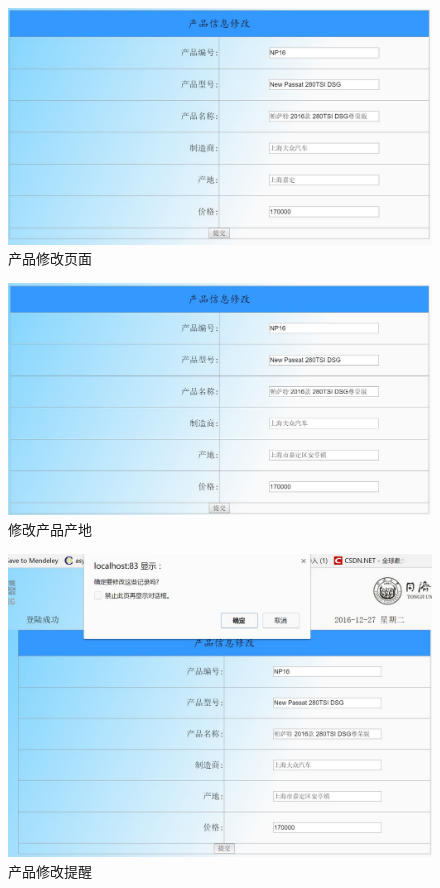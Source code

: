 \begin{figure}[H]
\centering
\includegraphics[width=0.8\linewidth]{figure/prd_mofify_index}
\caption{产品修改页面}
\label{fig:prd_mofify_index}
\end{figure}

\begin{figure}[H]
\centering
\includegraphics[width=0.8\linewidth]{figure/prd_mofify_area}
\caption{修改产品产地}
\label{fig:prd_mofify_area}
\end{figure}

\begin{figure}[H]
\centering
\includegraphics[width=0.8\linewidth]{figure/prd_mofify_alert}
\caption{产品修改提醒}
\label{fig:prd_mofify_alert}
\end{figure}

